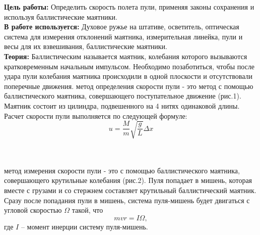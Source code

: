 \documentclass[a4paper, 12pt]{article}%
\newcommand{\RomanNumeralCaps}[1]{\uppercase\expandafter{\romannumeral#1}}
\begin{document}
	\newpage
	\textbf{Цель работы:} Определить скорость полета пули, применяя законы сохранения и используя баллистические маятники.\\
	\textbf{В работе используется:} Духовое ружье на штативе, осветитель, оптическая система для измерения отклонений маятника, измерительная линейка, пули и весы для их взвешивания, баллистические маятники. \\
	\textbf{Теория:} Баллистическим называется маятник, колебания которого вызываются кратковременным начальным импульсом. Необходимо позаботиться, чтобы после удара пули колебания маятника происходили в одной плоскости и отсутствовали поперечные движения.
	\RomanNumeralCaps{1} метод определения скорости пули - это метод с помощью баллистического маятника, совершающего поступательное движение (рис.1). Маятник состоит из цилиндра, подвешенного на 4 нитях одинаковой длины. Расчет скорости пули выполняется по следующей формуле: $$ u=\frac{M}{m} \sqrt{\frac{g}{L}} \Delta x $$ \\
		\begin{figure}[h]
	\end{figure}\\
	\RomanNumeralCaps{2} метод измерения скорости пули - это с помощью баллистического маятника, совершающего крутильные колебания (рис.2). Пуля попадает в мишень, которая вместе с грузами и со стержнем составляет крутильный баллистический маятник. Сразу после попадания пули в мишень, система пуля-мишень будет двигаться с угловой скоростью $\Omega$ такой, что
	\begin{equation}
		m v r = I \Omega,
	\end{equation}
	где $I$ -- момент инерции систему пуля-мишень.\\
\end{document}
